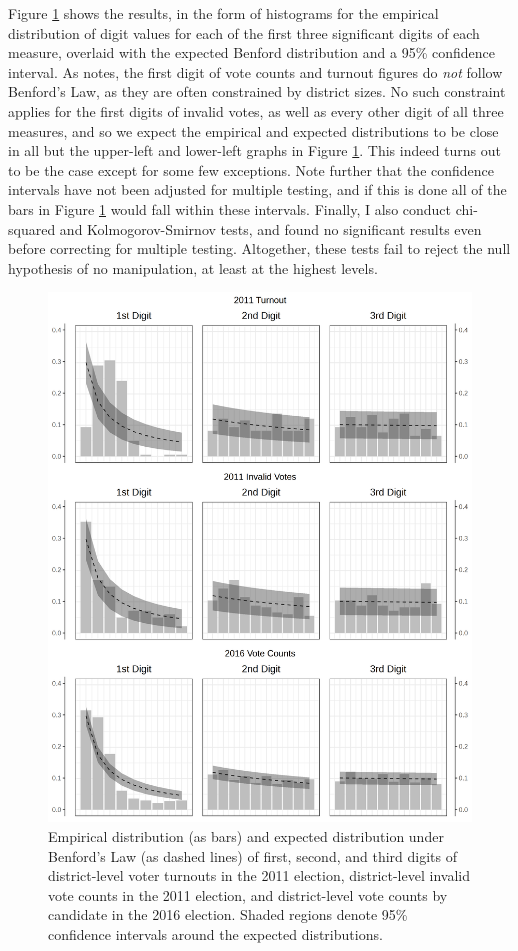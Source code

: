 \documentclass[12pt]{article}
\newcommand{\1}{\mathbbm{1}}
\begin{document}
Figure \ref{fig:Benford} shows the results, in the form of histograms for the empirical distribution of digit values for each of the first three significant digits of each measure, overlaid with the expected Benford distribution and a 95\% confidence interval. As \cite{Mebane2006} notes, the first digit of vote counts and turnout figures do \textit{not} follow Benford's Law, as they are often constrained by district sizes. No such constraint applies for the first digits of invalid votes, as well as every other digit of all three measures, and so we expect the empirical and expected distributions to be close in all but the upper-left and lower-left graphs in Figure \ref{fig:Benford}. This indeed turns out to be the case except for some few exceptions. Note further that the confidence intervals have not been adjusted for multiple testing, and if this is done all of the bars in Figure \ref{fig:Benford} would fall within these intervals. Finally, I also conduct chi-squared and Kolmogorov-Smirnov tests, and found no significant results even before correcting for multiple testing. Altogether, these tests fail to reject the null hypothesis of no manipulation, at least at the highest levels.

\begin{figure}[!htbp]
	\centering
	\includegraphics[height=.85\textheight]{figure/BENFORD_DIGIT_TEST.png}
	\caption[Digit Test of Election Results]{Empirical distribution (as bars) and expected distribution under Benford's Law (as dashed lines) of first, second, and third digits of district-level voter turnouts in the 2011 election, district-level invalid vote counts in the 2011 election, and district-level vote counts by candidate in the 2016 election. Shaded regions denote 95\% confidence intervals around the expected distributions.}
	\label{fig:Benford}
\end{figure}
\end{document}
